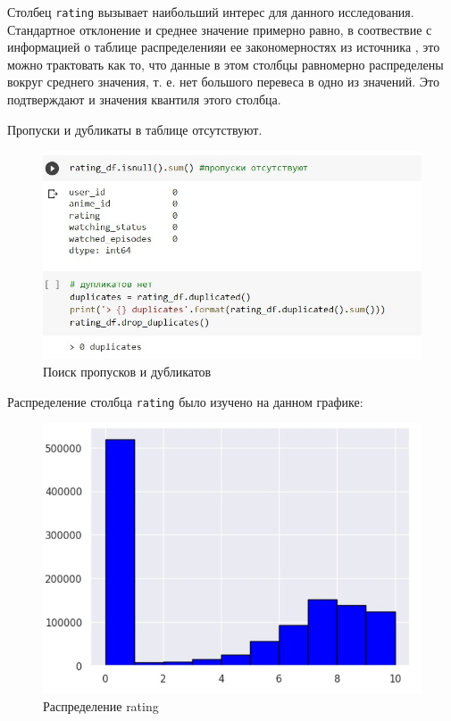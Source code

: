 \documentclass[bachelor, och, diploma]{SCWorks}
\begin{document}
Столбец \verb|rating| вызывает наибольший интерес для данного исследования. Стандартное отклонение и среднее значение примерно равно,
 в соотвествие с информацией о таблице распределенияи ее закономерностях из источника \cite{rashka2022}, это можно трактовать как то, что данные в этом столбцы равномерно распределены вокруг среднего значения, 
 т. е. нет большого перевеса в одно из значений. Это подтверждают и значения квантиля этого столбца.

Пропуски и дубликаты в таблице отсутствуют.

\begin{figure}[H]

	\centering
	
	\includegraphics[width=0.8\linewidth]{analis2.png}
	
	\caption{Поиск пропусков и дубликатов}
	
	\label{fig:a2}
	
\end{figure}

Распределение столбца \verb|rating| было изучено на данном графике:
\begin{figure}[h]

	\centering
	
	\includegraphics[width=0.8\linewidth]{analis3.png}
	
	\caption{Распределение rating}
	
	\label{fig:a3}
	
\end{figure}
\end{document}
